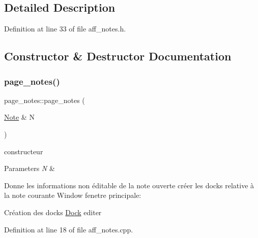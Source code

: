 \subsection{Detailed Description}


Definition at line 33 of file aff\+\_\+notes.\+h.



\subsection{Constructor \& Destructor Documentation}
\mbox{\label{classpage__notes_ad9a1b3dbe6c7901ed37a5784b1094fa6}} 
\subsubsection{\texorpdfstring{page\+\_\+notes()}{page\_notes()}}
{\footnotesize\ttfamily page\+\_\+notes\+::page\+\_\+notes (\begin{DoxyParamCaption}\item[{\hyperlink{class_note}{Note} \&}]{N }\end{DoxyParamCaption})}



constructeur 


\begin{DoxyParams}{Parameters}
{\em N} & \\
\hline
\end{DoxyParams}
Donne les informations non éditable de la note ouverte créer les docks relative à la note courante Window fenetre principale\+:

Création des docks \hyperlink{class_dock}{Dock} editer

Definition at line 18 of file aff\+\_\+notes.\+cpp.

